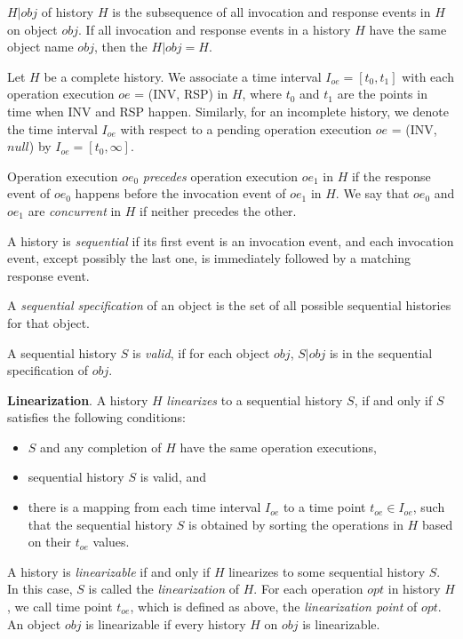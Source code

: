 $H|obj$ of history $H$ is the subsequence of all
invocation and response events in $H$ on object $obj$. If all invocation and response
events in a history $H$ have the same object name $obj$, then the $H|obj = H$.

Let $H$ be a complete history. We associate a time interval $I_{oe} = [t_0, t_1]$ with each
operation execution $oe$ = (INV, RSP) in $H$, where $t_0$ and $t_1$ are the points in time when INV and RSP happen.
Similarly, for an incomplete history, we denote the time interval $I_{oe}$ with respect to a pending
operation execution $oe$ = (INV, $null$) by $I_{oe} = [t_0, \infty]$.

Operation execution $oe_0$ \emph{precedes} operation execution $oe_1$ in $H$ if the response event of
$oe_0$ happens before the invocation event of $oe_1$ in $H$.
We say that $oe_0$ and $oe_1$ are \emph{concurrent} in $H$ if neither precedes the other.

A history is \emph{sequential} if its first event is an invocation event, and each invocation event, except
possibly the last one, is immediately followed by a matching response event.

A \emph{sequential specification} of an object is the set of all possible sequential histories
for that object.

A sequential history $S$ is \emph{valid}, if for each object $obj$, $S|obj$ is
in the sequential specification of $obj$.

\textbf{Linearization}.
A history $H$ \emph{linearizes} to a sequential history $S$, if and only if $S$ satisfies the
following conditions:
\begin{itemize}[leftmargin=1cm]
  \item $S$ and any completion of $H$ have the same operation executions,
  \item sequential history $S$ is valid, and
  \item there is a mapping from each time interval $I_{oe}$ to a time point $t_{oe} \in I_{oe}$, such
  that the sequential history $S$ is obtained by sorting the operations in $H$ based on their $t_{oe}$ values.
\end{itemize}

A history is \emph{linearizable} if and only if $H$ linearizes to some sequential history $S$. In this case,
$S$ is called the \emph{linearization} of $H$. For each operation $opt$ in history $H$, we call time point $t_{oe}$, which is
defined as above, the \emph{linearization point} of $opt$. An object $obj$ is linearizable if every
history $H$ on $obj$ is linearizable.


